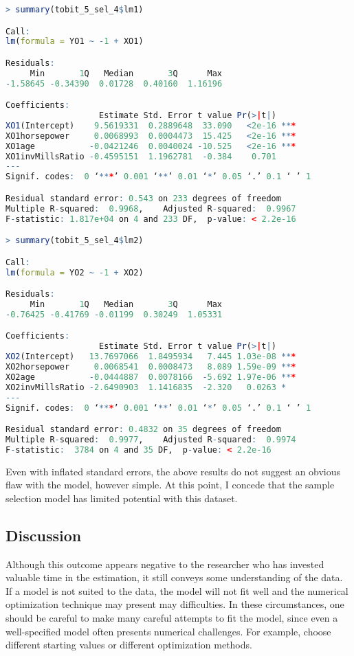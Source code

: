 \begin{lstlisting}[language=R]
> summary(tobit_5_sel_4$lm1)

Call:
lm(formula = YO1 ~ -1 + XO1)

Residuals:
     Min       1Q   Median       3Q      Max 
-1.58645 -0.34390  0.01728  0.40160  1.16196 

Coefficients:
                   Estimate Std. Error t value Pr(>|t|)    
XO1(Intercept)    9.5619331  0.2889648  33.090   <2e-16 ***
XO1horsepower     0.0068993  0.0004473  15.425   <2e-16 ***
XO1age           -0.0421246  0.0040024 -10.525   <2e-16 ***
XO1invMillsRatio -0.4595151  1.1962781  -0.384    0.701    
---
Signif. codes:  0 ‘***’ 0.001 ‘**’ 0.01 ‘*’ 0.05 ‘.’ 0.1 ‘ ’ 1

Residual standard error: 0.543 on 233 degrees of freedom
Multiple R-squared:  0.9968,	Adjusted R-squared:  0.9967 
F-statistic: 1.817e+04 on 4 and 233 DF,  p-value: < 2.2e-16

> summary(tobit_5_sel_4$lm2)

Call:
lm(formula = YO2 ~ -1 + XO2)

Residuals:
     Min       1Q   Median       3Q      Max 
-0.76425 -0.41769 -0.01199  0.30249  1.05331 

Coefficients:
                   Estimate Std. Error t value Pr(>|t|)    
XO2(Intercept)   13.7697066  1.8495934   7.445 1.03e-08 ***
XO2horsepower     0.0068541  0.0008473   8.089 1.59e-09 ***
XO2age           -0.0444887  0.0078166  -5.692 1.97e-06 ***
XO2invMillsRatio -2.6490903  1.1416835  -2.320   0.0263 *  
---
Signif. codes:  0 ‘***’ 0.001 ‘**’ 0.01 ‘*’ 0.05 ‘.’ 0.1 ‘ ’ 1

Residual standard error: 0.4832 on 35 degrees of freedom
Multiple R-squared:  0.9977,	Adjusted R-squared:  0.9974 
F-statistic:  3784 on 4 and 35 DF,  p-value: < 2.2e-16
\end{lstlisting}

Even with inflated standard errors, 
the above results do not suggest an obvious flaw with the model, 
however simple. 
At this point, I concede that the sample selection model has limited potential
with this dataset. 

\subsection{Discussion}

Although this outcome appears negative to the researcher 
who has invested valuable time in the estimation, 
it still conveys some understanding of the data. 
If a model is not suited to the data, the model will not fit well
and the numerical optimization technique may present may difficulties.
In these circumstances, one should be careful to make many careful attempts to fit the model, since even a well-specified model often presents numerical challenges. 
For example, choose different starting values or different optimization methods. 
% 

